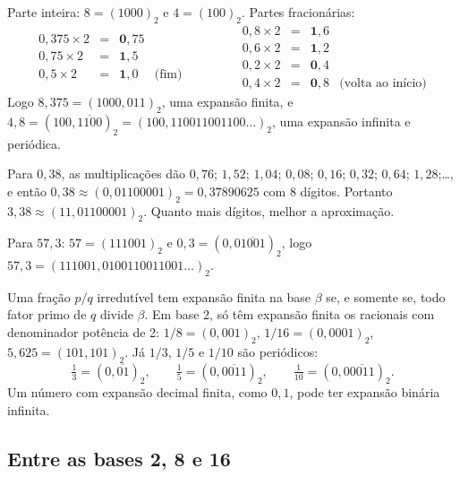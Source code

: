 \begin{exemplo}[{: $8{,}375$ e $4{,}8$ em binário}]
Parte inteira: $8=(1000)_2$ e $4=(100)_2$. Partes fracionárias:
\[
\begin{array}{rcll}
0{,}375\times2&=&\mathbf{0}{,}75\\
0{,}75\times2&=&\mathbf{1}{,}5\\
0{,}5\times2&=&\mathbf{1}{,}0&\text{(fim)}
\end{array}
\qquad\qquad
\begin{array}{rcll}
0{,}8\times2&=&\mathbf{1}{,}6\\
0{,}6\times2&=&\mathbf{1}{,}2\\
0{,}2\times2&=&\mathbf{0}{,}4\\
0{,}4\times2&=&\mathbf{0}{,}8&\text{(volta ao início)}
\end{array}
\]
Logo $8{,}375=(1000{,}011)_2$, uma expansão finita, e
$4{,}8=(100{,}\overline{1100})_2=(100{,}110011001100\dots)_2$, uma expansão infinita e periódica.
\end{exemplo}

\begin{exemplo}[{: $3{,}38$ e $57{,}3$ (Aula 01)}]
Para $0{,}38$, as multiplicações dão $0{,}76$; $1{,}52$; $1{,}04$; $0{,}08$; $0{,}16$; $0{,}32$; $0{,}64$; $1{,}28$;\dots,
e então $0{,}38\approx(0{,}01100001)_2=0{,}37890625$ com 8 dígitos. Portanto
$3{,}38\approx(11{,}01100001)_2$. Quanto mais dígitos, melhor a aproximação.

Para $57{,}3$: $57=(111001)_2$ e $0{,}3=(0{,}0\overline{1001})_2$, logo
$57{,}3=(111001{,}0100110011001\dots)_2$.
\end{exemplo}

\begin{observacao}
Uma fração $p/q$ irredutível tem expansão finita na base $\beta$ se, e somente se, todo fator primo
de $q$ divide $\beta$. Em base 2, só têm expansão finita os racionais com denominador potência de 2:
$1/8=(0{,}001)_2$, $1/16=(0{,}0001)_2$, $5{,}625=(101{,}101)_2$. Já $1/3$, $1/5$ e $1/10$ são periódicos:
\[
\tfrac13=(0{,}\overline{01})_2,\qquad \tfrac15=(0{,}\overline{0011})_2,\qquad
\tfrac1{10}=(0{,}0\overline{0011})_2 .
\]
Um número com expansão decimal finita, como $0{,}1$, pode ter expansão binária infinita.
\end{observacao}

\subsection{Entre as bases 2, 8 e 16}

